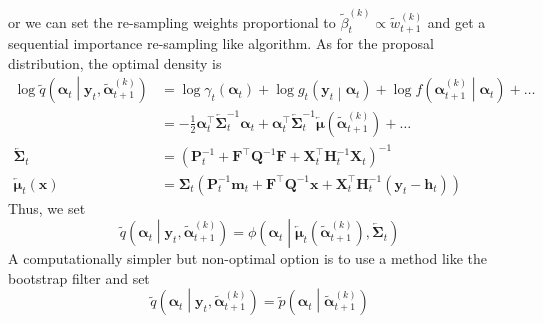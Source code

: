 \documentclass[notitlepage]{article}
\renewcommand{\vec}[1]{\bm{#1}}
\newcommand{\vecLarrow}[1]{\overleftarrow{\vec{#1}}}
\newcommand{\mat}[1]{\mathbf{#1}}
\newcommand{\matLarrow}[1]{\overleftarrow{\mat{#1}}}
\newcommand{\Lparen}[1]{\left( #1\right)}
\newcommand{\Cond}[2]{ #1 \middle\vert  #2}
\newcommand{\optor}[2]{#1\Lparen{#2}}
\newcommand{\optorC}[3]{\optor{#1}{\Cond{#2}{#3}}}
\newcommand{\pdenstC}[2]{\optorC{\widetilde p}{#1}{#2}}
\newcommand{\normaldC}[3]{\optorC{\phi}{#1}{#2,#3}}
\newcommand{\IDAproxC}[2]{\optorC{\widetilde{q}}{#1}{#2}}
\newcommand{\partic}[3]{#1_{#2}^{\Lparen{#3}}}
\newcommand{\particB}[3]{\widetilde{#1}_{#2}^{\Lparen{#3}}}
\begin{document}
%
or we can set the re-sampling weights proportional to %
$\particB{\beta}{t}{k}\propto \particB w{t + 1}k$ and get a sequential importance re-sampling like algorithm. As for the proposal distribution, the optimal density is%
%
\begin{align*}
\log \IDAproxC{\vec\alpha_t}{\vec y_t, \particB{\vec{\alpha}}{t + 1}k}
	& = \log \gamma_t\Lparen{\vec{\alpha}_t}
	+ \log\optorC{g_t}{\vec y_t}{\vec{\alpha}_t}
	+ \log\optorC{f}{\partic{\vec\alpha}{t+1}k}{\vec\alpha_t} + \dots \\
	& = - \frac 12 \vec\alpha_t^\top \matLarrow\Sigma^{-1}_t\vec\alpha_t
		+ \vec\alpha_t^\top \matLarrow\Sigma_t^{-1}\vecLarrow\mu(
			\particB{\vec\alpha}{t + 1}k) + \dots \\
\matLarrow\Sigma_t &= \Lparen{\mat P_t^{-1} + \mat F^\top\mat Q^{-1}\mat F + 
		\mat X_t^\top \mat H^{-1}_t \mat X_t}^{-1} \\
\vecLarrow\mu_t(\vec x) &= \mat\Sigma_t\Lparen{
	\mat P_t^{-1}\vec m_t + \mat F^\top \mat Q^{-1}\vec x + 
	\mat X_t^\top\mat H_t^{-1}(\vec y_t - \vec h_t)}
\end{align*}%
%
Thus, we set %
%
$$
\IDAproxC{\vec\alpha_t}{\vec y_t, \particB{\vec{\alpha}}{t + 1}k} = 
\normaldC{\vec\alpha_t}{
		\vecLarrow\mu_t(\particB{\vec{\alpha}}{t + 1}k)}{
		\matLarrow\Sigma_t}
$$%
% 
A computationally simpler but non-optimal option is to use a method like the bootstrap filter 
and set%
%
\begin{equation}\label{eq:bootBW}
\IDAproxC{\vec\alpha_t}{\vec y_t, \particB{\vec{\alpha}}{t + 1}k} = 
	\pdenstC{\vec{\alpha}_t}{\particB{\vec{\alpha}}{t + 1}k}
\end{equation}
\end{document}
